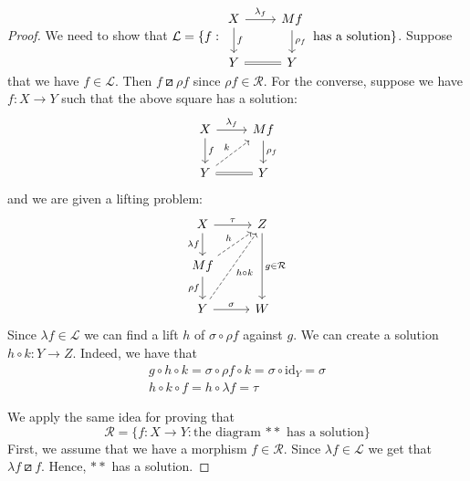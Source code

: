 \documentclass{article}
\theoremstyle{definition}
\newcommand{\comp}{\mathbin{\circ}}
\newcommand{\idarrow}[1][]{\mathrm{id}_{#1}}
\begin{document}
\begin{proof}
We need to show that
$\mathcal{L} = \{f : \begin{tikzcd}
                      X \ar[r,"\lambda_f"] \ar[d,"f"] & Mf \ar[d,"\rho_f"] \\
                      Y \ar[r,equal] & Y
                     \end{tikzcd}
 \text{ has a solution}\}$.
Suppose that we have $f \in \mathcal{L}$.
Then $f \boxslash \rho f$ since $\rho f \in \mathcal{R}$.
For the converse, suppose we have
$f :X \to Y$ such that the above square has a
solution:
\[
 \begin{tikzcd}
  X \ar[r,"\lambda_f"] \ar[d,"f"] & Mf \ar[d,"\rho_f"] \\
  Y \ar[r,equal] \ar[ur, dashed, "k"] & Y
\end{tikzcd}
\]
and we are given a lifting problem:
\[
 \begin{tikzcd}
  X \rar["\tau"] \dar["\lambda f"'] & Z \ar[dd, "g \in \mathcal{R}"] \\
  M f \dar["\rho f"'] \ar[ur, dashed, "h"] & \\
  Y \rar["\sigma"] \ar[uur, dashed, "h \comp k"'] & W
 \end{tikzcd}
\]
Since $\lambda f \in \mathcal{L}$
we can find a lift $h$ of $\sigma \comp \rho f$
against $g$. We can create a solution
$h \comp k : Y \to Z$. Indeed,
we have that
\begin{align*}
 g \comp h \comp k = \sigma \comp \rho f \comp k = \sigma \comp \idarrow[Y] = \sigma \\
 h \comp k \comp f = h \comp \lambda f = \tau
\end{align*}

We apply the same idea for proving
that
\[
 \mathcal{R} = \{f: X \to Y : \text{the diagram $**$ has a solution}\}
\]
First, we assume that we have a morphism
$f \in \mathcal{R}$. Since $\lambda f \in \mathcal{L}$
we get that $\lambda f \boxslash f$. Hence,
$**$ has a solution.


\end{proof}
\end{document}
